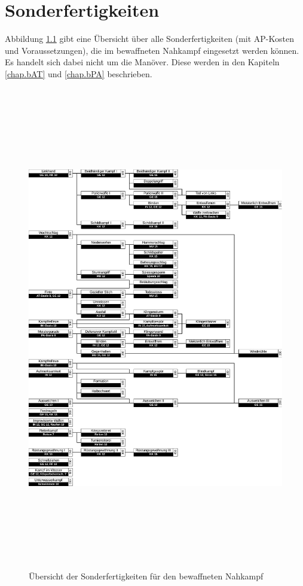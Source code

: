 %

\chapter{Sonderfertigkeiten}
Abbildung \ref{fig.nSF} gibt eine Übersicht über alle Sonderfertigkeiten (mit AP-Kosten und Voraussetzungen), die im bewaffneten Nahkampf eingesetzt werden können.
Es handelt sich dabei nicht um die Manöver.
Diese werden in den Kapiteln \ref{chap.bAT} und \ref{chap.bPA} beschrieben.

\begin{figure}
    \centering
    \includegraphics[width=16.986cm,height=21.179cm]{fig/bSF.pdf}
    \caption{Übersicht der Sonderfertigkeiten für den bewaffneten Nahkampf}
    \label{fig.nSF}
\end{figure}

